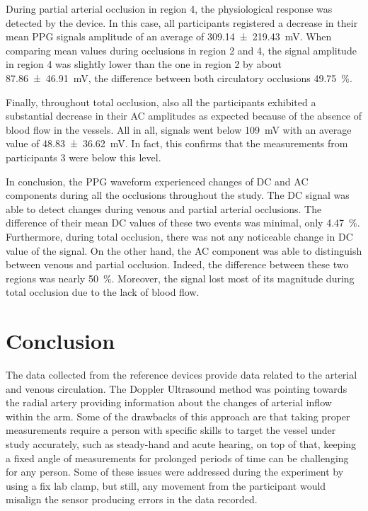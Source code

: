 During partial arterial occlusion in region 4, the physiological response was detected by the device. In this case, all participants registered a decrease in their mean PPG signals amplitude of an average of \SI{309.14(21943)}{\milli\volt}. When comparing mean values during occlusions in region 2 and 4, the signal amplitude in region 4 was slightly lower than the one in region 2 by about \SI{87.86(4691)}{\milli\volt}, the difference between both circulatory occlusions \SI{49.75}{\percent}.

Finally, throughout total occlusion, also all the participants exhibited a substantial decrease in their AC amplitudes as expected because of the absence of blood flow in the vessels. All in all, signals went below \SI{109}{\milli\volt} with an average value of \SI{48.83(3662)}{\milli\volt}. In fact, this confirms that the measurements from participants 3 were below this level. 

In conclusion, the PPG waveform experienced changes of DC and AC components during all the occlusions throughout the study. The DC signal was able to detect changes during venous and partial arterial occlusions. The difference of their mean DC values of these two events was minimal, only \SI{4.47}{\percent}. Furthermore, during total occlusion, there was not any noticeable change in DC value of the signal.  On the other hand, the AC component was able to distinguish between venous and partial occlusion. Indeed, the difference between these two regions was nearly \SI{50}{\percent}. Moreover, the signal lost most of its magnitude during total occlusion due to the lack of blood flow.

\section{Conclusion}
\label{section comparison 5}
The data collected from the reference devices provide data related to the arterial and venous circulation. The Doppler Ultrasound method was pointing towards the radial artery providing information about the changes of arterial inflow within the arm. Some of the drawbacks of this approach are that taking proper measurements require a person with specific skills to target the vessel under study accurately, such as steady-hand and acute hearing, on top of that, keeping a fixed angle of measurements for prolonged periods of time can be challenging for any person. Some of these issues were addressed during the experiment by using a fix lab clamp, but still, any movement from the participant would misalign the sensor producing errors in the data recorded. 

